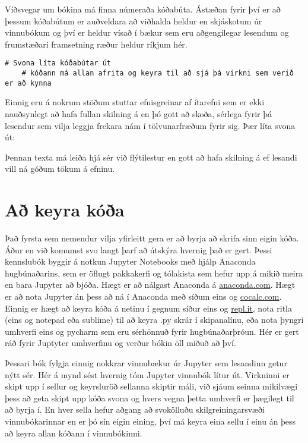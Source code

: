 Víðsvegar um bókina má finna númeraða kóðabúta.
Ástæðan fyrir því er að þessum kóðabútum er auðveldara að viðhalda heldur en skjáskotum úr vinnubókum og því er heldur vísað í bækur sem eru aðgengilegar lesendum og frumstæðari framsetning ræður heldur ríkjum hér.

\begin{lstlisting}[caption=Kóðabútar kynntir til sögunnar]
	# Svona líta kóðabútar út
	# kóðann má allan afrita og keyra til að sjá þá virkni sem verið er að kynna
\end{lstlisting}

Einnig eru á nokrum stöðum stuttar efnisgreinar af ítarefni sem er ekki nauðsynlegt að hafa fullan skilning á en þó gott að skoða, sérlega fyrir þá lesendur sem vilja leggja frekara nám í tölvunarfræðum fyrir sig.
Þær líta svona út:

\begin{valBox}
	Þennan texta má leiða hjá sér við flýtilestur en gott að hafa skilning á ef lesandi vill ná góðum tökum á efninu.
\end{valBox}

\section{Að keyra kóða}\label{uk:keyra-koda}

Það fyrsta sem nemendur vilja yfirleitt gera er að byrja að skrifa sinn eigin kóða. 
Áður en við komumst svo langt þarf að útskýra hvernig það er gert. 
Þessi kennslubók byggir á notkun Jupyter Notebooks með hjálp Anaconda hugbúnaðarins, sem er öflugt pakkakerfi og tólakista sem hefur upp á mikið meira en bara Jupyter að bjóða. 
Hægt er að nálgast Anaconda á \href{www.anaconda.com}{anaconda.com}.
Hægt er að nota Jupyter án þess að ná í Anaconda með síðum eins og \href{www.cocalc.com}{cocalc.com}. 
Einnig er hægt að keyra kóða á netinu í gegnum síður eins og \href{www.repl.it}{repl.it}, nota ritla (eins og notepad eða sublime) til að keyra .py skrár í skipanalínu, eða nota þyngri umhverfi eins og pycharm sem eru sérhönnuð fyrir hugbúnaðarþróun. 
Hér er gert ráð fyrir Juptyter umhverfinu og verður bókin öll miðuð að því.


Þessari bók fylgja einnig nokkrar vinnubækur úr Jupyter sem lesandinn getur nýtt sér. 
Hér á mynd  sést hvernig tóm Jupyter vinnubók lítur út. 
Virkninni er skipt upp í sellur og keyrsluröð sellanna skiptir máli, við sjáum seinna mikilvægi þess að geta skipt upp kóða svona og hvers vegna þetta umhverfi er þægilegt til að byrja í. 
En hver sella hefur aðgang að svokölluðu skilgreiningarsvæði vinnubókarinnar en er þó sín eigin eining, því má keyra eina sellu í einu án þess að keyra allan kóðann í vinnubókinni.

